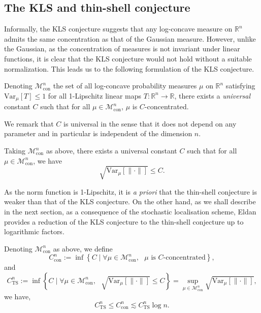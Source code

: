 \subsection{The KLS and thin-shell conjecture}

Informally, the KLS conjecture suggests that any log-concave measure on \(\mathbb{R}^n\) admits 
the same concentration as that of the Gaussian measure. However, unlike the Gaussian, as the 
concentration of measures is not invariant under linear functions, it is clear that the KLS 
conjecture would not hold without a suitable normalization. This leads us to the following formulation 
of the KLS conjecture.

\begin{conjecture}\label{conj:KLS}
  Denoting \(\mathscr{M}^n_{\text{con}}\) the set of all log-concave probability measures \(\mu\) on 
  \(\mathbb{R}^n\) satisfying \(\text{Var}_\mu[T] \le 1\) for all 1-Lipschitz linear maps 
  \(T : \mathbb{R}^n \to \mathbb{R}\), there exists a \textit{universal} constant \(C\) such that for all 
  \(\mu \in \mathscr{M}^n_{\text{con}}\), \(\mu\) is \(C\)-concentrated.
\end{conjecture}

We remark that \(C\) is universal in the sense that it does not depend on any parameter and in 
particular is independent of the dimension \(n\).

\begin{conjecture}
  Taking \(\mathscr{M}^n_{\text{con}}\) as above, there exists a universal constant \(C\) such that 
  for all \(\mu \in \mathscr{M}^n_{\text{con}}\), we have
  \[\sqrt{\text{Var}_\mu[\|\cdot\|]} \le C.\]
\end{conjecture}

As the norm function is 1-Lipschitz, it is \textit{a priori} that the thin-shell conjecture is 
weaker than that of the KLS conjecture. On the other hand, as we shall describe in the next section, 
as a consequence of the stochastic localisation scheme, Eldan \cite{Eldan_2013} provides a reduction 
of the KLS conjecture to the thin-shell conjecture up to logarithmic factors. 

\begin{theorem}\label{thm:KLS_to_TS}
  Denoting \(\mathscr{M}^n_{\text{con}}\) as above, we define 
  \[C^n_{\text{con}} := \inf \left\{C \mid \text{\(\forall \mu \in \mathscr{M}^n_{\text{con}},\) 
    \(\mu\) is \(C\)-concentrated}\right\},\]
  and 
  \[C^n_{\text{TS}} := \inf \left\{C \mid \text{\(\forall \mu \in \mathscr{M}^n_{\text{con}},\) 
      \(\sqrt{\text{Var}_\mu[\|\cdot\|]} \le C\)}\right\}
      = \sup_{\mu \in \mathscr{M}^n_{\text{con}}} \sqrt{\text{Var}_\mu[\|\cdot\|]},\]
  we have,
  \[C^n_{\text{TS}} \le C^n_{\text{con}} \lesssim C^n_{\text{TS}} \log n.\]
\end{theorem}

